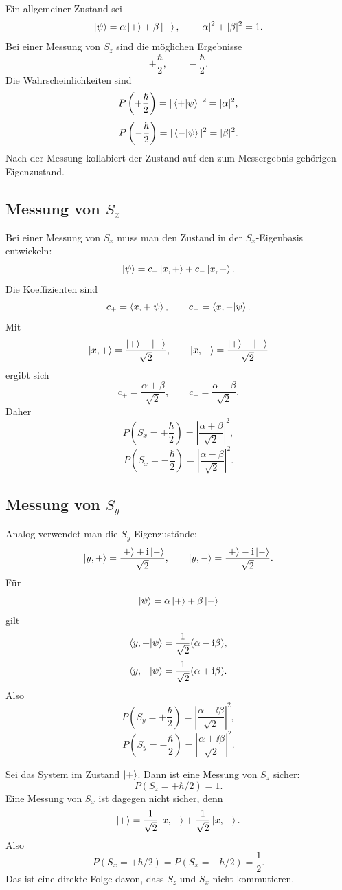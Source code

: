 Ein allgemeiner Zustand sei
\[
    \left|\psi\right\rangle=\alpha\left|+\right\rangle+\beta\left|-\right\rangle,
    \qquad |\alpha|^2+|\beta|^2=1.
\]
Bei einer Messung von \(S_z\) sind die möglichen Ergebnisse
\[
    +\frac{\hbar}{2},
    \qquad
    -\frac{\hbar}{2}.
\]
Die Wahrscheinlichkeiten sind
\[
    P\left(+\frac{\hbar}{2}\right)=|\left\langle+\middle|\psi\right\rangle|^2=|\alpha|^2,
\]
\[
    P\left(-\frac{\hbar}{2}\right)=|\left\langle-\middle|\psi\right\rangle|^2=|\beta|^2.
\]
Nach der Messung kollabiert der Zustand auf den zum Messergebnis gehörigen Eigenzustand.

\subsection{Messung von \(S_x\)}

Bei einer Messung von \(S_x\) muss man den Zustand in der \(S_x\)-Eigenbasis entwickeln:
\[
    \left|\psi\right\rangle=c_+\left|x,+\right\rangle+c_-\left|x,-\right\rangle.
\]
Die Koeffizienten sind
\[
    c_+=\left\langle x,+\middle|\psi\right\rangle,
    \qquad
    c_-=\left\langle x,-\middle|\psi\right\rangle.
\]
Mit
\[
    \left|x,+\right\rangle=\frac{\left|+\right\rangle+\left|-\right\rangle}{\sqrt2},
    \qquad
    \left|x,-\right\rangle=\frac{\left|+\right\rangle-\left|-\right\rangle}{\sqrt2}
\]
ergibt sich
\[
    c_+=\frac{\alpha+\beta}{\sqrt2},
    \qquad
    c_- =\frac{\alpha-\beta}{\sqrt2}.
\]
Daher
\[
    P\left(S_x=+\frac{\hbar}{2}\right)
    =\left|\frac{\alpha+\beta}{\sqrt2}\right|^2,
\]
\[
    P\left(S_x=-\frac{\hbar}{2}\right)
    =\left|\frac{\alpha-\beta}{\sqrt2}\right|^2.
\]

\subsection{Messung von \(S_y\)}

Analog verwendet man die \(S_y\)-Eigenzustände:
\[
    \left|y,+\right\rangle=\frac{\left|+\right\rangle+\mathrm{i}\left|-\right\rangle}{\sqrt2},
    \qquad
    \left|y,-\right\rangle=\frac{\left|+\right\rangle-\mathrm{i}\left|-\right\rangle}{\sqrt2}.
\]
Für
\[
    \left|\psi\right\rangle=\alpha\left|+\right\rangle+\beta\left|-\right\rangle
\]
gilt
\[
    \left\langle y,+\middle|\psi\right\rangle
    =\frac{1}{\sqrt2}(\alpha-\mathrm{i}\beta),
\]
\[
    \left\langle y,-\middle|\psi\right\rangle
    =\frac{1}{\sqrt2}(\alpha+\mathrm{i}\beta).
\]
Also
\[
    P\left(S_y=+\frac{\hbar}{2}\right)
    =\left|\frac{\alpha-\ii\beta}{\sqrt2}\right|^2,
\]
\[
    P\left(S_y=-\frac{\hbar}{2}\right)
    =\left|\frac{\alpha+\ii\beta}{\sqrt2}\right|^2.
\]

\begin{examplebox}
Sei das System im Zustand \(\left|+\right\rangle\). Dann ist eine Messung von \(S_z\) sicher:
\[
    P(S_z=+\hbar/2)=1.
\]
Eine Messung von \(S_x\) ist dagegen nicht sicher, denn
\[
    \left|+\right\rangle=\frac{1}{\sqrt2}\left|x,+\right\rangle+\frac{1}{\sqrt2}\left|x,-\right\rangle.
\]
Also
\[
    P(S_x=+\hbar/2)=P(S_x=-\hbar/2)=\frac12.
\]
Das ist eine direkte Folge davon, dass \(S_z\) und \(S_x\) nicht kommutieren.
\end{examplebox}

